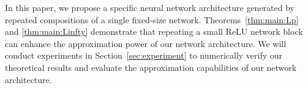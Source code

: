 \documentclass[nohyperref]{article}
\theoremstyle{plain}
\theoremstyle{definition}
\theoremstyle{remark}
\begin{document}
In this paper, we propose a specific neural network architecture generated by repeated compositions of a single fixed-size network. Theorems~\ref{thm:main:Lp} and \ref{thm:main:Linfty} demonstrate that repeating a small ReLU network block can enhance the approximation power of our network architecture. We will conduct experiments in Section~\ref{sec:experiment} to numerically verify our theoretical results and evaluate the approximation capabilities of our network architecture.
\end{document}

